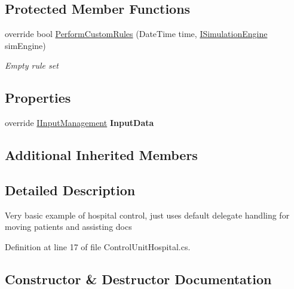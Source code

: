 \subsection*{Protected Member Functions}
\begin{DoxyCompactItemize}
\item 
override bool \hyperlink{class_sample_hospital_model_1_1_hospital_1_1_control_unit_hospital_a0c45513ebfe8a4f17a36395ce01c2123}{Perform\+Custom\+Rules} (Date\+Time time, \hyperlink{interface_simulation_core_1_1_simulation_classes_1_1_i_simulation_engine}{I\+Simulation\+Engine} sim\+Engine)
\begin{DoxyCompactList}\small\item\em Empty rule set \end{DoxyCompactList}\end{DoxyCompactItemize}
\subsection*{Properties}
\begin{DoxyCompactItemize}
\item 
override \hyperlink{interface_general_health_care_elements_1_1_management_1_1_i_input_management}{I\+Input\+Management} {\bfseries Input\+Data}\hypertarget{class_sample_hospital_model_1_1_hospital_1_1_control_unit_hospital_a112c5297d2f30619324dde97ca11c870}{}\label{class_sample_hospital_model_1_1_hospital_1_1_control_unit_hospital_a112c5297d2f30619324dde97ca11c870}

\end{DoxyCompactItemize}
\subsection*{Additional Inherited Members}


\subsection{Detailed Description}
Very basic example of hospital control, just uses default delegate handling for moving patients and assisting docs 



Definition at line 17 of file Control\+Unit\+Hospital.\+cs.



\subsection{Constructor \& Destructor Documentation}
